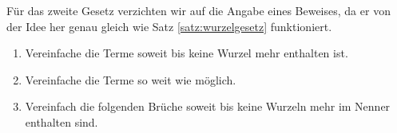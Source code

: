 \documentclass[11pt,oneside]{article}
\begin{document}
    Für das zweite Gesetz verzichten wir auf die Angabe eines Beweises, da er von der Idee her genau gleich wie Satz \ref{satz:wurzelgesetz} funktioniert.
    \begin{aufgabe}
    	\begin{enumerate}
    		\item Vereinfache die Terme soweit bis keine Wurzel mehr enthalten ist.
    		\item Vereinfache die Terme so weit wie möglich.
    		\item Vereinfach die folgenden Brüche soweit bis keine Wurzeln mehr im Nenner enthalten sind.
    	\end{enumerate}
    \end{aufgabe}
\end{document}
